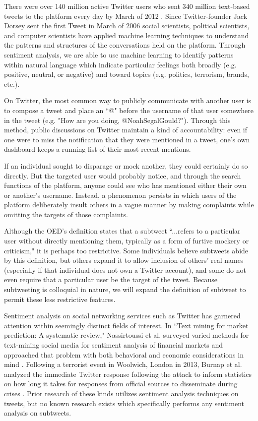 \documentclass[11pt, twoside, reqno]{book}
\begin{document}
There were over 140 million active Twitter users who sent 340 million text-based tweets to the platform every day by March of 2012 \cite{twitter_stats}. Since Twitter-founder Jack Dorsey sent the first Tweet in March of 2006 \cite{first_tweet} social scientists, political scientists, and computer scientists have applied machine learning techniques to understand the patterns and structures of the conversations held on the platform. Through sentiment analysis, we are able to use machine learning to identify patterns within natural language which indicate particular feelings both broadly (e.g. positive, neutral, or negative) and toward topics (e.g. politics, terrorism, brands, etc.).

On Twitter, the most common way to publicly communicate with another user is to compose a tweet and place an ``@" before the username of that user somewhere in the tweet (e.g. "How are you doing, @NoahSegalGould?"). Through this method, public discussions on Twitter maintain a kind of accountability: even if one were to miss the notification that they were mentioned in a tweet, one's own dashboard keeps a running list of their most recent mentions. 

If an individual sought to disparage or mock another, they could certainly do so directly. But the targeted user would probably notice, and through the search functions of the platform, anyone could see who has mentioned either their own or another's username. Instead, a phenomenon persists in which users of the platform deliberately insult others in a vague manner by making complaints while omitting the targets of those complaints. 

Although the OED's definition states that a subtweet ``...refers to a particular user without directly mentioning them, typically as a form of furtive mockery or criticism," it is perhaps too restrictive. Some individuals believe subtweets abide by this definition, but others expand it to allow inclusion of others' real names (especially if that individual does not own a Twitter account), and some do not even require that a particular user be the target of the tweet. Because subtweeting is colloquial in nature, we will expand the definition of subtweet to permit these less restrictive features.

Sentiment analysis on social networking services such as Twitter has garnered attention within seemingly distinct fields of interest. In ``Text mining for market prediction: A systematic review," Nassirtoussi et al. surveyed varied methods for text-mining social media for sentiment analysis of financial markets and approached that problem with both behavioral and economic considerations in mind \cite{sentiment_analysis_markets}. Following a terrorist event in Woolwich, London in 2013, Burnap et al. analyzed the immediate Twitter response following the attack to inform statistics on how long it takes for responses from official sources to disseminate during crises \cite{sentiment_analysis_terrorism}. Prior research of these kinds utilizes sentiment analysis techniques on tweets, but no known research exists which specifically performs any sentiment analysis on subtweets. 
\end{document}
